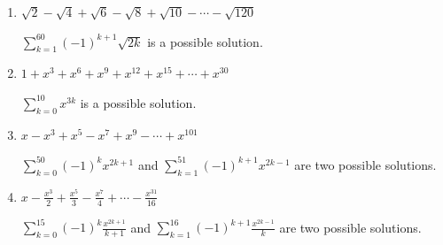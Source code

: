 \documentclass[main]{subfiles}
\begin{document}
\begin{enumerate}
\begin{enumerate}
    \item

    
    \begin{problem}[0.5in]
    $\displaystyle \sqrt{2} - \sqrt{4} + \sqrt{6} - \sqrt{8} + \sqrt{10}
    - \cdots - \sqrt{120}$
    \end{problem}

    \begin{solution}
    $\displaystyle \sum_{k=1}^{60} (-1)^{k + 1} \sqrt{2k}$ is a possible
    solution.
    \end{solution}

    \item
    \begin{problem}[0.5in]
    $\displaystyle 1 + x^3 + x^6 + x^9 + x^{12} + x^{15} + \cdots +
    x^{30}$
    \end{problem}

    \begin{solution}
    $\displaystyle \sum_{k=0}^{10} x^{3k}$ is a possible solution.
    \end{solution}

    \item
    \begin{problem}[0.5in]
    $x - x^3 + x^5 - x^7 + x^9 - \cdots + x^{101}$
    \end{problem}

    \begin{solution}
    $\displaystyle \sum_{k=0}^{50} (-1)^k x^{2k + 1}$ and $\displaystyle
    \sum_{k=1}^{51} (-1)^{k + 1} x^{2k - 1}$ are two possible solutions.
    \end{solution}
    
    \item
    \begin{problem}[0.5in]
    $\displaystyle x - \frac{x^3}{2} + \frac{x^5}{3} - \frac{x^7}{4} +
    \cdots - \frac{x^{31}}{16}$
    \end{problem}
    
    \begin{solution}
    $\displaystyle \sum_{k=0}^{15} (-1)^k \frac{x^{2k + 1}}{k + 1}$ and
    $\displaystyle \sum_{k=1}^{16} (-1)^{k + 1} \frac{x^{2k - 1}}{k}$
    are two possible solutions.
    \end{solution}
  \end{enumerate}


\end{enumerate}
\end{document}
